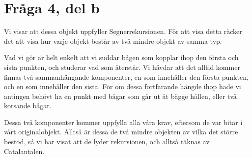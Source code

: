 \documentclass[nobib]{tufte-handout}
\begin{document}
\section{Fråga 4, del b}

Vi visar att dessa objekt uppfyller Segnerrekursionen. För att visa detta räcker det att visa hur varje objekt består av två mindre objekt av samma typ.

Vad vi gör är helt enkelt att vi suddar bågen som kopplar ihop den första och sista punkten, och studerar vad som återstår. Vi hävdar att det alltid kommer finnas två sammanhängande komponenter, en som innehåller den första punkten, och en som innehåller den sista. För om dessa fortfarande hängde ihop hade vi antingen behövt ha en punkt med bågar som går ut åt bägge hållen, eller två korsande bågar.

Dessa två komponenter kommer uppfylla alla våra krav, eftersom de var bitar i vårt originalobjekt. Alltså är dessa de två mindre objekten av vilka det större bestod, så vi har visat att de lyder rekursionen, och alltså räknas av Catalantalen.

%
%
\end{document}
